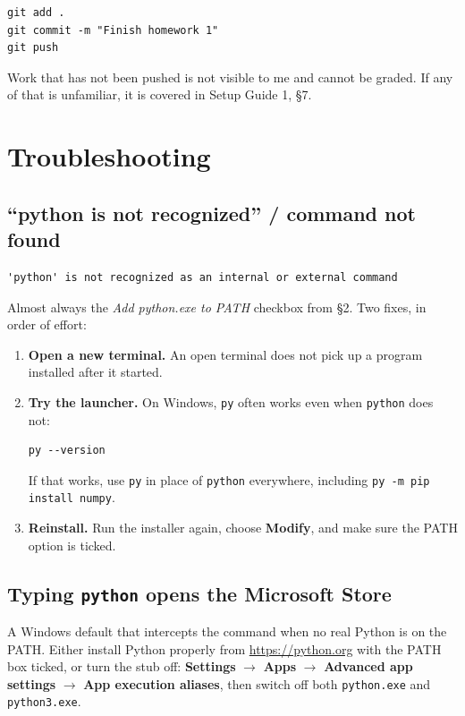 \documentclass[11pt]{article}
\begin{document}
\begin{lstlisting}
git add .
git commit -m "Finish homework 1"
git push
\end{lstlisting}

\noindent Work that has not been pushed is not visible to me and cannot be
graded. If any of that is unfamiliar, it is covered in Setup Guide 1, \S7.

\section{Troubleshooting}

\subsection{``python is not recognized'' / command not found}
\begin{lstlisting}
'python' is not recognized as an internal or external command
\end{lstlisting}
Almost always the \emph{Add python.exe to PATH} checkbox from \S2. Two fixes, in
order of effort:

\begin{enumerate}[leftmargin=2.0em,itemsep=3pt]
  \item \textbf{Open a new terminal.} An open terminal does not pick up a
        program installed after it started.
  \item \textbf{Try the launcher.} On Windows, \texttt{py} often works even when
        \texttt{python} does not:
\begin{lstlisting}
py --version
\end{lstlisting}
        If that works, use \texttt{py} in place of \texttt{python} everywhere,
        including \texttt{py -m pip install numpy}.
  \item \textbf{Reinstall.} Run the installer again, choose \textbf{Modify}, and
        make sure the PATH option is ticked.
\end{enumerate}

\subsection{Typing \texttt{python} opens the Microsoft Store}
A Windows default that intercepts the command when no real Python is on the
PATH. Either install Python properly from \url{https://python.org} with the PATH
box ticked, or turn the stub off: \textbf{Settings} $\to$ \textbf{Apps} $\to$
\textbf{Advanced app settings} $\to$ \textbf{App execution aliases}, then switch
off both \texttt{python.exe} and \texttt{python3.exe}.
\end{document}
